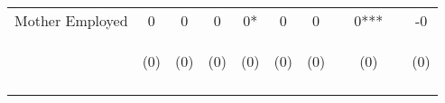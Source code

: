 \begin{tabular}{lcccccccccc}
\noalign{\smallskip}Mother Employed & 0 & 0 & 0 & 0* & 0 & 0 &  & 0*** &  & -0\\
 & \begin{footnotesize}(0)\end{footnotesize} & \begin{footnotesize}(0)\end{footnotesize} & \begin{footnotesize}(0)\end{footnotesize} & \begin{footnotesize}(0)\end{footnotesize} & \begin{footnotesize}(0)\end{footnotesize} & \begin{footnotesize}(0)\end{footnotesize} & \begin{footnotesize}\end{footnotesize} & \begin{footnotesize}(0)\end{footnotesize} & \begin{footnotesize}\end{footnotesize} & \begin{footnotesize}(0)\end{footnotesize}\\
\noalign{\smallskip}\hline\end{tabular}\\

